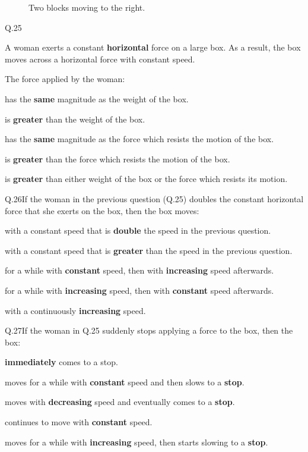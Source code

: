     \begin{figure}[h!]
        \begin{center}
            
            \caption{\label{fig:blocks19} Two blocks moving to the right.}
        \end{center}
    \end{figure}



    \begin{mcq}{Q.25}{A woman exerts a constant \textbf{horizontal} force on a large box. As a result, the box moves across a horizontal force with constant speed.
   
        \eline[]
        The force applied by the woman:
    }
        \item has the \textbf{same} magnitude as the weight of the box.
        \item is \textbf{greater} than the weight of the box.
        \item has the \textbf{same} magnitude as the force which resists the motion of the box.
        \item is \textbf{greater} than the force which resists the motion of the box.
        \item is \textbf{greater} than either weight of the box or the force which resists its motion.
    \end{mcq}

    \begin{mcq}{Q.26}{If the woman in the previous question (Q.25) doubles the constant horizontal force that she exerts on the box, then the box moves:}
        \item with a constant speed that is \textbf{double} the speed in the previous question.
        \item with a constant speed that is \textbf{greater} than the speed in the previous question.
        \item for a while with \textbf{constant} speed, then with \textbf{increasing} speed afterwards.
        \item for a while with \textbf{increasing} speed, then with \textbf{constant} speed afterwards.
        \item with a continuously \textbf{increasing} speed.
    \end{mcq}

    \begin{mcq}{Q.27}{If the woman in Q.25 suddenly stops applying a force to the box, then the box:}
        \item \textbf{immediately} comes to a stop.
        \item moves for a while with \textbf{constant} speed and then slows to a \textbf{stop}.
        \item moves with \textbf{decreasing} speed and eventually comes to a \textbf{stop}.
        \item continues to move with \textbf{constant} speed.
        \item moves for a while with \textbf{increasing} speed, then starts slowing to a \textbf{stop}.
    \end{mcq}

